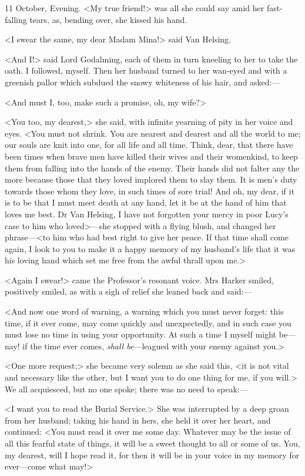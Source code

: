 \begin{diary}{11 October, Evening.}
<My true friend!> was all she could say amid her fast-falling tears, as, bending over, she kissed his hand.

<I swear the same, my dear Madam Mina!> said Van Helsing.

<And I\@!> said Lord Godalming, each of them in turn kneeling to her to take the oath. I followed, myself. Then her husband turned to her wan-eyed and with a greenish pallor which subdued the snowy whiteness of his hair, and asked:—

<And must I, too, make such a promise, oh, my wife?>

<You too, my dearest,> she said, with infinite yearning of pity in her voice and eyes. <You must not shrink. You are nearest and dearest and all the world to me; our souls are knit into one, for all life and all time. Think, dear, that there have been times when brave men have killed their wives and their womenkind, to keep them from falling into the hands of the enemy. Their hands did not falter any the more because those that they loved implored them to slay them. It is men's duty towards those whom they love, in such times of sore trial! And oh, my dear, if it is to be that I must meet death at any hand, let it be at the hand of him that loves me best. Dr Van Helsing, I have not forgotten your mercy in poor Lucy's case to him who loved>—she stopped with a flying blush, and changed her phrase—<to him who had best right to give her peace. If that time shall come again, I look to you to make it a happy memory of my husband's life that it was his loving hand which set me free from the awful thrall upon me.>

<Again I swear!> came the Professor's resonant voice. Mrs Harker smiled, positively smiled, as with a sigh of relief she leaned back and said:—

<And now one word of warning, a warning which you must never forget: this time, if it ever come, may come quickly and unexpectedly, and in such case you must lose no time in using your opportunity. At such a time I myself might be—nay! if the time ever comes, \textit{shall be}—leagued with your enemy against you.>

<One more request;> she became very solemn as she said this, <it is not vital and necessary like the other, but I want you to do one thing for me, if you will.> We all acquiesced, but no one spoke; there was no need to speak:—

<I want you to read the Burial Service.> She was interrupted by a deep groan from her husband; taking his hand in hers, she held it over her heart, and continued: <You must read it over me some day. Whatever may be the issue of all this fearful state of things, it will be a sweet thought to all or some of us. You, my dearest, will I hope read it, for then it will be in your voice in my memory for ever—come what may!>


\end{diary}
